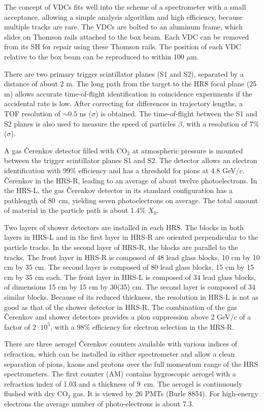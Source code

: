 The concept of VDCs fits well into the scheme of a spectrometer with a small 
acceptance, allowing a simple analysis algorithm and high efficiency, 
because multiple tracks are rare.
The VDCs are bolted to an aluminum frame, which slides on Thomson rails 
attached to the box beam. 
Each VDC can be removed from its SH for repair using these Thomson rails. 
The position of each VDC relative to the box beam can be reproduced to within 
100 $\mu$m. 

There are two primary trigger scintillator planes (S1 and S2), 
separated by a distance of about 2 m. 
The long path from the target to the HRS focal plane (25 m) allows 
accurate time-of-flight identification in coincidence experiments 
if the accidental rate is low. 
After correcting for differences in trajectory lengths, 
a TOF resolution of $\sim 0.5$ ns ($\sigma$) is obtained. 
The time-of-flight between the S1 and S2 planes is also 
used to measure the speed of particles $\beta$, with a resolution of 7\% ($\sigma$).

A gas \v{C}erenkov detector filled  with CO$_{2}$ at atmospheric 
pressure is mounted between the trigger scintillator planes S1 and S2. 
The detector allows an electron identification  with 99\% efficiency
and has a threshold for pions at 4.8 GeV/$c$. 
\v{C}erenkov in the HRS-R, leading to an average of about twelve photoelectrons. 
In the HRS-L, the gas \v{C}erenkov detector in its standard configuration has 
a pathlength of 80~cm, yielding seven photoelectrons on average. 
The total amount of material in the particle path is about 1.4\% $X_0$. 

Two layers of shower detectors are installed in each HRS. 
The blocks in both layers in HRS-L and in the first 
layer in HRS-R are oriented perpendicular to the particle tracks. In 
the second layer of HRS-R, the blocks are parallel to the tracks. The front 
layer in HRS-R is composed of 48 lead glass blocks, 
10 cm by 10 cm by 35 cm. The second layer is composed of 80 
lead glass blocks, 15 cm by 15 cm by 35 cm each.  
The front layer in HRS-L is composed of 34 lead glass blocks, of 
dimensions 15 cm by 15 cm by 30(35) cm. The second layer is  composed 
of 34 similar blocks. Because of its reduced thickness, the resolution in 
HRS-L is not as good as that of the shower detector in HRS-R.
The combination of the gas \v{C}erenkov and shower detectors provides a 
pion suppression above 2 GeV/$c$ of  a factor of $2 \cdot 10^{5}$, with a 
98\% efficiency for electron selection in the HRS-R. 

There are  three aerogel \v{C}erenkov counters available with various indices
of refraction, which can be installed in either spectrometer and allow 
a clean separation of pions, kaons and protons over the full momentum 
range of the HRS spectrometers.
The first counter (AM) contains hygroscopic aerogel  
with a refraction index of 1.03 and a thickness of 9~cm. The 
aerogel is continuously flushed with dry CO$_{2}$ gas.  It is viewed 
by 26 PMTs (Burle 8854). For high-energy electrons the average 
number of photo-electrons is about 7.3. 

